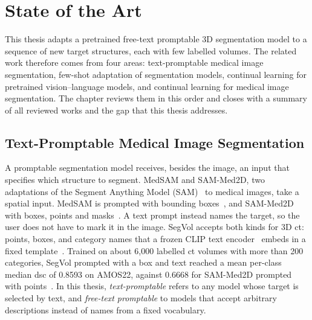 %
%

\chapter{State of the Art}
\label{chap:sota}

This thesis adapts a pretrained free-text promptable 3D segmentation model to a sequence of new target structures, each with few labelled volumes.
The related work therefore comes from four areas: text-promptable medical image segmentation, few-shot adaptation of segmentation models, continual learning for pretrained vision--language models, and continual learning for medical image segmentation.
The chapter reviews them in this order and closes with a summary of all reviewed works and the gap that this thesis addresses.

\section{Text-Promptable Medical Image Segmentation}
\label{sec:text-promptable-seg}

A promptable segmentation model receives, besides the image, an input that specifies which structure to segment.
MedSAM and SAM-Med2D, two adaptations of the Segment Anything Model (SAM)~\cite{Kirillov_2023_ICCV} to medical images, take a spatial input.
MedSAM is prompted with bounding boxes~\cite{Ma_2024}, and SAM-Med2D with boxes, points and masks~\cite{cheng2023sammed2d}.
A text prompt instead names the target, so the user does not have to mark it in the image.
SegVol accepts both kinds for 3D \gls{ct}: points, boxes, and category names that a frozen CLIP text encoder~\cite{radford2021learningtransferablevisualmodels} embeds in a fixed template~\cite{du2025segvoluniversalinteractivevolumetric}.
Trained on about 6{,}000 labelled \gls{ct} volumes with more than 200 categories, SegVol prompted with a box and text reached a mean per-class median \gls{dsc} of 0.8593 on AMOS22, against 0.6668 for SAM-Med2D prompted with points~\cite{du2025segvoluniversalinteractivevolumetric}.
In this thesis, \emph{text-promptable} refers to any model whose target is selected by text, and \emph{free-text promptable} to models that accept arbitrary descriptions instead of names from a fixed vocabulary.

